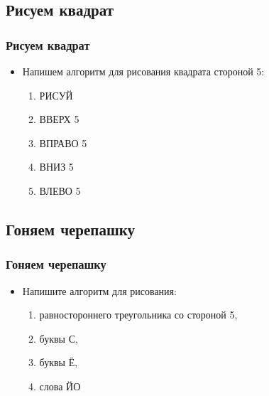 \documentclass[compress,red]{beamer}
\begin{document}
\subsection{Рисуем квадрат}
\begin{frame}[fragile]
  \frametitle{Рисуем квадрат}
  \begin{itemize}
      \item Напишем алгоритм для рисования квадрата стороной 5:
      \begin{enumerate}
          \item РИСУЙ
          \item ВВЕРХ 5
          \item ВПРАВО 5
          \item ВНИЗ 5
          \item ВЛЕВО 5
      \end{enumerate}
  \end{itemize}
\end{frame}

\subsection{Гоняем черепашку}
\begin{frame}[fragile]
  \frametitle{Гоняем черепашку}
  \begin{itemize}
    \item Напишите алгоритм для рисования:
        \begin{enumerate}
            \item равностороннего треугольника со стороной 5,
            \item буквы С,
            \item буквы Ё,
            \item слова ЙО
        \end{enumerate}
  \end{itemize}
\end{frame}
\end{document}
